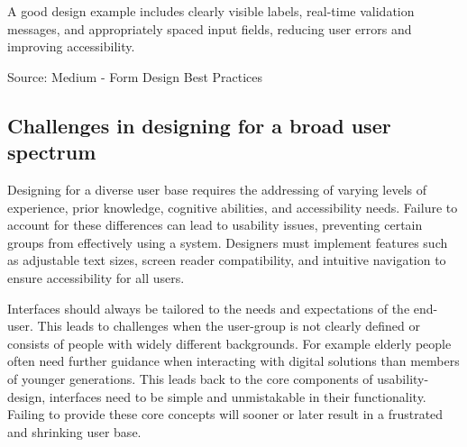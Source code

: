 A good design example includes clearly visible labels, real-time validation messages, and appropriately spaced input fields, reducing user errors and improving accessibility.

Source: Medium - Form Design Best Practices

\subsection{Challenges in designing for a broad user spectrum}

Designing for a diverse user base requires the addressing of varying levels of experience, prior knowledge, cognitive abilities, and accessibility needs. Failure to account for these differences can lead to usability issues, preventing certain groups from effectively using a system. Designers must implement features such as adjustable text sizes, screen reader compatibility, and intuitive navigation to ensure accessibility for all users.

\blankLine

Interfaces should always be tailored to the needs and expectations of the end-user. This leads to challenges when the user-group is not clearly defined or consists of people with widely different backgrounds. For example elderly people often need further guidance when interacting with digital solutions than members of younger generations. This leads back to the core components of usability-design, interfaces need to be simple and unmistakable in their functionality. Failing to provide these core concepts will sooner or later result in a frustrated and shrinking user base. 
\autocite{Paul:UIUXIntroduction}

\blankLine



\newpage